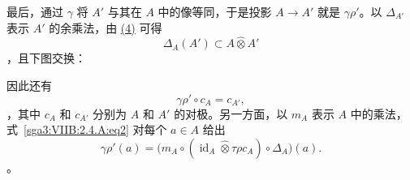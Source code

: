 最后，通过 \(\gamma\) 将 \(A'\) 与其在 \(A\) 中的像等同，于是投影 \(A\to A'\) 就是 \(\gamma\rho'\)。以 \(\Delta_{A'}\) 表示 \(A'\) 的余乘法，由 \hyperref[sga3:VIIB:2.4.A:eq4-diagram]{\textup{(4)}} 可得 \[
  \Delta_A(A')\subset A\widehat\otimes A'
\]，且下图交换：\begin{center} \label{sga3:VIIB:2.4.A:Aprime-comultiplication-square} \end{center}因此还有 \[
  \gamma\rho'\circ c_A=c_{A'},
\]，其中 \(c_A\) 和 \(c_{A'}\) 分别为 \(A\) 和 \(A'\) 的对极。另一方面，以 \(m_A\) 表示 \(A\) 中的乘法，式~\eqref{sga3:VIIB:2.4.A:eq2} 对每个 \(a\in A\) 给出 \[
  \gamma\rho'(a)
  =
  \bigl(
    m_A
    \circ
    (\operatorname{id}_A\widehat\otimes\tau\rho c_A)
    \circ
    \Delta_A
  \bigr)(a).
\]。
